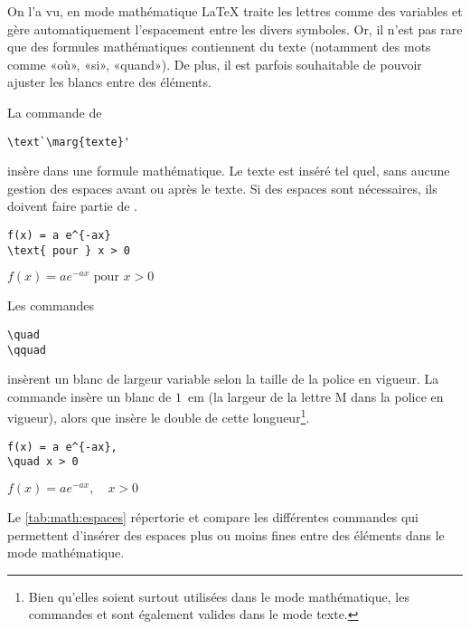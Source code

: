 On l'a vu, en mode mathématique {\LaTeX} traite les lettres comme des
variables et gère automatiquement l'espacement entre les divers
symboles. Or, il n'est pas rare que des formules mathématiques
contiennent du texte (notamment des mots comme «où», «si», «quand»).
De plus, il est parfois souhaitable de pouvoir ajuster les blancs
entre des éléments.

La commande de 
\begin{lstlisting}
\text`\marg{texte}'
\end{lstlisting}
insère  dans une formule mathématique. Le texte est inséré
tel quel, sans aucune gestion des espaces avant ou après le texte. Si
des espaces sont nécessaires, ils doivent faire partie de
.
\begin{demo}
  \begin{texample}
\begin{lstlisting}
f(x) = a e^{-ax}
\text{ pour } x > 0
\end{lstlisting}
    \producing $f(x) = a e^{-ax} \text{ pour } x > 0$
  \end{texample}
\end{demo}

Les commandes
\begin{lstlisting}
\quad
\qquad
\end{lstlisting}
insèrent un blanc de largeur variable selon la taille de la police en
vigueur. La commande \cmd{\quad} insère un blanc de $1$~em (la largeur de
la lettre M dans la police en vigueur), alors que \cmd{\qquad}
insère le double de cette longueur\footnote{%
  Bien qu'elles soient surtout utilisées dans le mode mathématique,
  les commandes \cmd{\quad} et \cmd{\qquad} sont également valides
  dans le mode texte.}.
\begin{demo}
  \begin{texample}
\begin{lstlisting}
f(x) = a e^{-ax},
\quad x > 0
\end{lstlisting}
    \producing
    $f(x) = a e^{-ax}, \quad x > 0$
  \end{texample}
\end{demo}

Le \autoref{tab:math:espaces} répertorie et compare les différentes
commandes qui permettent d'insérer des espaces plus ou moins fines
entre des éléments dans le mode mathématique.

